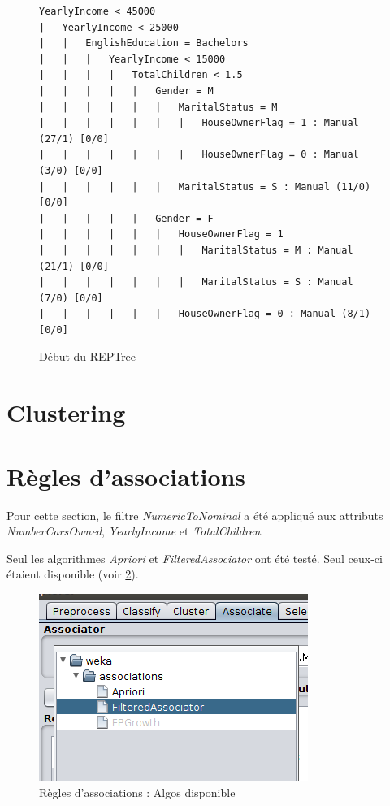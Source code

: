 \begin{figure}[H]
\centering
\begin{lstlisting}
YearlyIncome < 45000
|   YearlyIncome < 25000
|   |   EnglishEducation = Bachelors
|   |   |   YearlyIncome < 15000
|   |   |   |   TotalChildren < 1.5
|   |   |   |   |   Gender = M
|   |   |   |   |   |   MaritalStatus = M
|   |   |   |   |   |   |   HouseOwnerFlag = 1 : Manual (27/1) [0/0]
|   |   |   |   |   |   |   HouseOwnerFlag = 0 : Manual (3/0) [0/0]
|   |   |   |   |   |   MaritalStatus = S : Manual (11/0) [0/0]
|   |   |   |   |   Gender = F
|   |   |   |   |   |   HouseOwnerFlag = 1
|   |   |   |   |   |   |   MaritalStatus = M : Manual (21/1) [0/0]
|   |   |   |   |   |   |   MaritalStatus = S : Manual (7/0) [0/0]
|   |   |   |   |   |   HouseOwnerFlag = 0 : Manual (8/1) [0/0]
\end{lstlisting}
\caption{Début du REPTree}
\label{lst:reptree_sample}
\end{figure}


\section{Clustering}


\section{Règles d'associations}

Pour cette section, le filtre \textit{NumericToNominal} a été appliqué aux attributs \textit{NumberCarsOwned}, \textit{YearlyIncome} et \textit{TotalChildren}.

Seul les algorithmes \textit{Apriori} et \textit{FilteredAssociator} ont été testé. Seul ceux-ci étaient disponible (voir \ref{associate}).

\begin{figure}[H]
    \centering
    \includegraphics[width=0.5\linewidth, fbox]{img/associate.png}
    \caption{Règles d'associations : Algos disponible}
    \label{associate}
\end{figure}

